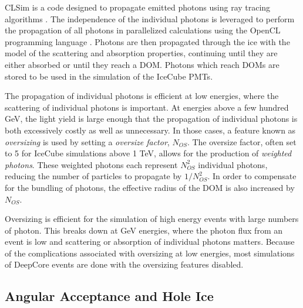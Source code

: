 CLSim is a code designed to propagate emitted photons using ray tracing algorithms \cite{PPC}.
The independence of the individual photons is leveraged to perform the propagation of all photons in parallelized calculations using the OpenCL programming language \cite{OpenCL}.
Photons are then propagated through the ice with the model of the scattering and absorption properties, continuing until they are either absorbed or until they reach a DOM.
Photons which reach DOMs are stored to be used in the simulation of the IceCube PMTs.

The propagation of individual photons is efficient at low energies, where the scattering of individual photons is important.
At energies above a few hundred GeV, the light yield is large enough that the propagation of individual photons is both excessively costly as well as unnecessary.
In those cases, a feature known as \emph{oversizing} is used by setting a \emph{oversize factor}, $N_{OS}$.
The oversize factor, often set to 5 for IceCube simulations above 1 TeV, allows for the production of \emph{weighted photons}.
These weighted photons each represent $N^2_{OS}$ individual photons, reducing the number of particles to propagate by $1/N^2_{OS}$.
In order to compensate for the bundling of photons, the effective radius of the DOM is also increased by $N_{OS}$.

Oversizing is efficient for the simulation of high energy events with large numbers of photon.
This breaks down at GeV energies, where the photon flux from an event is low and scattering or absorption of individual photons matters.
Because of the complications associated with oversizing at low energies, most simulations of DeepCore events are done with the oversizing features disabled.

\subsection{Angular Acceptance and Hole Ice}
\label{subsec:holeice_sim}

